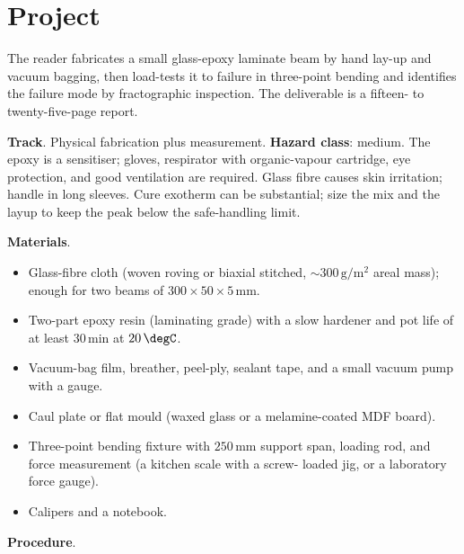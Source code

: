 \section{Project}

\begin{project}
The reader fabricates a small glass-epoxy laminate beam by hand lay-up
and vacuum bagging, then load-tests it to failure in three-point
bending and identifies the failure mode by fractographic inspection.
The deliverable is a fifteen- to twenty-five-page report.

\textbf{Track}. Physical fabrication plus measurement.
\textbf{Hazard class}: medium. The epoxy is a sensitiser; gloves,
respirator with organic-vapour cartridge, eye protection, and good
ventilation are required. Glass fibre causes skin irritation; handle
in long sleeves. Cure exotherm can be substantial; size the mix and
the layup to keep the peak below the safe-handling limit.

\textbf{Materials}.

\begin{itemize}[leftmargin=*]
\item Glass-fibre cloth (woven roving or biaxial stitched, $\sim 300\,
  \text{g}/\text{m}^2$ areal mass); enough for two beams of $300 \times
  50 \times 5\,\text{mm}$.
\item Two-part epoxy resin (laminating grade) with a slow hardener and
  pot life of at least $30\,\text{min}$ at $20\,\degC$.
\item Vacuum-bag film, breather, peel-ply, sealant tape, and a small
  vacuum pump with a gauge.
\item Caul plate or flat mould (waxed glass or a melamine-coated MDF
  board).
\item Three-point bending fixture with $250\,\text{mm}$ support span,
  loading rod, and force measurement (a kitchen scale with a screw-
  loaded jig, or a laboratory force gauge).
\item Calipers and a notebook.
\end{itemize}

\textbf{Procedure}.


\end{project}
